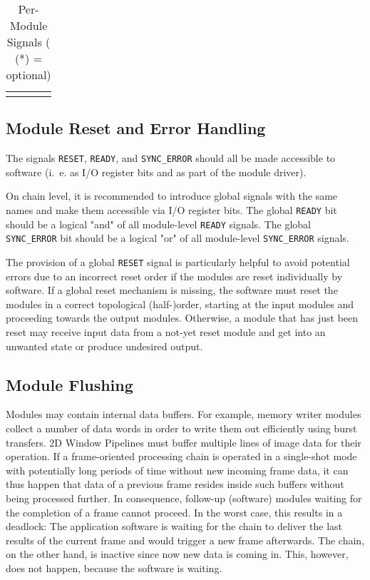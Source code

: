 \begin{longtable}[ht]{|c|c|c|c|}
\hline 

\caption{Per-Module Signals ( (*) = optional)} \label{05-02-module_signals}\\
\end{longtable}



\subsection{Module Reset and Error Handling} \label{ch:05-02-interfaces-module_signals-error_handling}

The signals \texttt{RESET}, \texttt{READY}, and \texttt{SYNC\_ERROR} should all be made accessible to software (i.~e. as I/O register bits and as part of the module driver).

On chain level, it is recommended to introduce global signals with the same names and make them accessible via I/O register bits. The global \texttt{READY} bit should be a logical "and" of all module-level \texttt{READY} signals. The global \texttt{SYNC\_ERROR} bit should be a logical "or" of all module-level \texttt{SYNC\_ERROR} signals.

The provision of a global \texttt{RESET} signal is particularly helpful to avoid potential errors due to an incorrect reset order if the modules are reset individually by software. If a global reset mechanism is missing, the software must reset the modules in a correct topological (half-)order, starting at the input modules and proceeding towards the output modules. Otherwise, a module that has just been reset may receive input data from a not-yet reset module and get into an unwanted state or produce undesired output.



\subsection{Module Flushing}

Modules may contain internal data buffers. For example, memory writer modules collect a number of data words in order to write them out efficiently using burst transfers. 2D Window Pipelines must buffer multiple lines of image data for their operation. If a frame-oriented processing chain is operated in a single-shot mode with potentially long periods of time without new incoming frame data, it can thus happen that data of a previous frame resides inside such buffers without being processed further. In consequence, follow-up (software) modules waiting for the completion of a frame cannot proceed. In the worst case, this results in a deadlock: The application software is waiting for the \asterics chain to deliver the last results of the current frame and would trigger a new frame afterwards. The \asterics chain, on the other hand, is inactive since now new data is coming in. This, however, does not happen, because the software is waiting.

